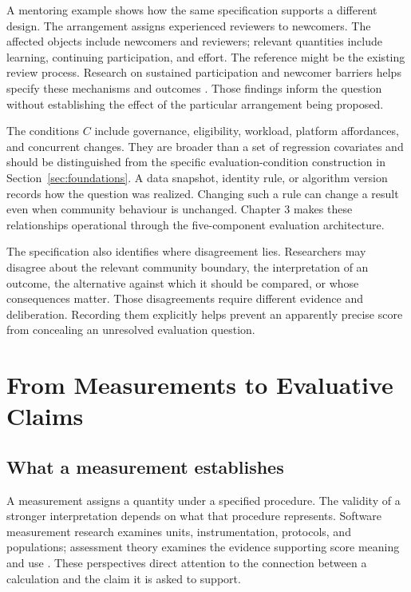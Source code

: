 A mentoring example shows how the same specification supports a different design. The arrangement assigns experienced reviewers to newcomers. The affected objects include newcomers and reviewers; relevant quantities include learning, continuing participation, and effort. The reference might be the existing review process. Research on sustained participation and newcomer barriers helps specify these mechanisms and outcomes \citep{fang2009,steinmacher2015}. Those findings inform the question without establishing the effect of the particular arrangement being proposed.

The conditions \(C\) include governance, eligibility, workload, platform affordances, and concurrent changes. They are broader than a set of regression covariates and should be distinguished from the specific evaluation-condition construction in Section~\ref{sec:foundations}. A data snapshot, identity rule, or algorithm version records how the question was realized. Changing such a rule can change a result even when community behaviour is unchanged. Chapter 3 makes these relationships operational through the five-component evaluation architecture.

The specification also identifies where disagreement lies. Researchers may disagree about the relevant community boundary, the interpretation of an outcome, the alternative against which it should be compared, or whose consequences matter. Those disagreements require different evidence and deliberation. Recording them explicitly helps prevent an apparently precise score from concealing an unresolved evaluation question.

\section{From Measurements to Evaluative Claims}
\label{sec:evidence}

\subsection{What a measurement establishes}
A measurement assigns a quantity under a specified procedure. The validity of a stronger interpretation depends on what that procedure represents. Software measurement research examines units, instrumentation, protocols, and populations; assessment theory examines the evidence supporting score meaning and use \citep{kitchenham1995,messick1995}. These perspectives direct attention to the connection between a calculation and the claim it is asked to support.

